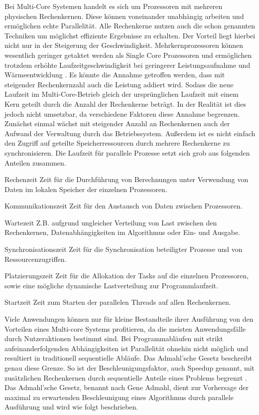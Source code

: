 Bei Multi-Core Systemen handelt es sich um Prozessoren mit mehreren physischen Rechenkernen. Diese können voneinander unabhängig arbeiten und ermöglichen echte Parallelität. Alle Rechenkerne nutzen auch die schon genannten Techniken um möglichst effiziente Ergebnisse zu erhalten. Der Vorteil liegt hierbei nicht nur in der Steigerung der Geschwindigkeit. Mehrkernprozessoren können wesentlich geringer getaktet werden als Single Core Prozessoren und ermöglichen trotzdem erhöhte Laufzeitgeschwindigkeit bei geringerer Leistungsaufnahme und Wärmeentwicklung \cite{MulicoreElektro}. Es könnte die Annahme getroffen werden, dass mit steigender Rechenkernzahl auch die Leistung addiert wird. Sodass die neue Laufzeit im Multi-Core-Betrieb gleich der ursprünglichen Laufzeit mit einem Kern geteilt durch die Anzahl der Rechenkerne beträgt. In der Realität ist dies jedoch nicht umsetzbar, da verschiedene Faktoren diese Annahme begrenzen. Zunächst einmal wächst mit steigender Anzahl an Rechenkernen auch der Aufwand der Verwaltung durch das Betriebssystem. Außerdem ist es nicht einfach den Zugriff auf geteilte Speicherressourcen durch mehrere Rechenkerne zu synchronisieren. Die Laufzeit für parallele Prozesse setzt sich grob aus folgenden Anteilen zusammen.
\begin{aligneddescription}
\item[Rechenzeit] Zeit für die Durchführung von Berechnungen unter Verwendung von Daten im lokalen Speicher der einzelnen Prozessoren.
\item[Kommunikationszeit] Zeit für den Austausch von Daten zwischen Prozessoren.
\item[Wartezeit] Z.B. aufgrund ungleicher Verteilung von Last zwischen den Rechenkernen, Datenabhängigkeiten im Algorithmus oder Ein- und Ausgabe.
\item[Synchronisationszeit] Zeit für die Synchronisation beteiligter Prozesse und von Ressourcenzugriffen.
\item[Platzierungszeit] Zeit für die Allokation der Tasks auf die einzelnen Prozessoren, sowie eine mögliche dynamische Lastverteilung zur Programmlaufzeit.
\item[Startzeit] Zeit zum Starten der parallelen Threads auf allen Rechenkernen.
\end{aligneddescription}\cite[313]{parallelBook}

Viele Anwendungen können nur für kleine Bestandteile ihrer Ausführung von den Vorteilen eines Multi-core Systems profitieren, da die meisten Anwendungsfälle durch Nutzeraktionen bestimmt sind. Bei Programmabläufen mit strikt aufeinanderfolgenden Abhängigkeiten ist Parallelität ohnehin nicht möglich und resultiert in traditionell sequentielle Abläufe. Das Admahl'sche Gesetz beschreibt genau diese Grenze. So ist der Beschleunigungsfaktor, auch Speedup genannt, mit zusätzlichen Rechenkernen durch sequentielle Anteile eines Problems begrenzt \cite[314]{parallelBook}. Das Admahl'sche Gesetz, benannt nach Gene Admahl, dient zur Vorhersage der maximal zu erwartenden Beschleunigung eines Algorithmus durch parallele Ausführung und wird wie folgt beschrieben.


